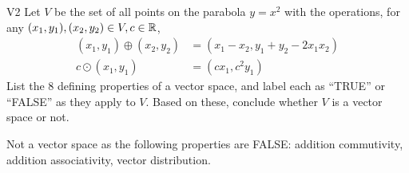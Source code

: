 \begin{problem}{V2}
Let \(V\) be the  set of all points on the parabola \(y=x^2\) with the operations, for any \((x_1,y_1), (x_2,y_2) \in V,c \in \mathbb{R}\),
\begin{align*}
(x_1,y_1) \oplus (x_2,y_2) &= (x_1-x_2,y_1+y_2-2x_1x_2) \\
c \odot (x_1,y_1) &= (cx_1, c^2y_1)
\end{align*}
  List the 8 defining properties of a vector space, and label each as
  ``TRUE'' or ``FALSE'' as they apply to \(V\). Based on these, conclude whether
  \(V\) is a vector space or not.

\end{problem}
\begin{solution}
Not a vector space as the following properties are FALSE:
addition commutivity, addition associativity, vector distribution.
\end{solution}


